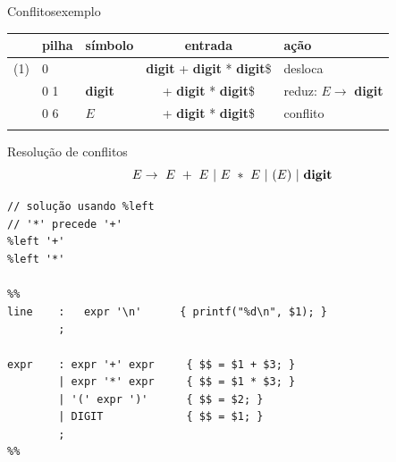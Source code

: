\begin{frame}{Conflitos}{exemplo}
\centering\small
  \bigskip

  \scriptsize
  \begin{tabular}[h]{r|l|l|c|l}
    \toprule
    & \hfil pilha &\hfil símbolo & entrada &\hfil ação \\
    \midrule
    (1) & 0 &  &\hfill {\bf digit} + {\bf digit} * {\bf digit}\$& desloca \\
    \only<2->{
    (2) & 0 1 &   {\bf digit} &\hfill + {\bf digit} * {\bf digit}\$ & reduz: $E\rightarrow$ {\bf digit} \\
    }
    \only<3->{
    (3) & 0 6 &   $E$ &\hfill + {\bf digit} * {\bf digit}\$ & {\large\color{red}conflito} \\
    }
    & & & &\\
   \bottomrule
  \end{tabular}
\end{frame}

\begin{frame}[fragile]{Resolução de conflitos}
  $$E \rightarrow\ E\ +\ E\ |\ E\ *\ E\ |\ (E)\ |\ \text{\bf digit} $$

  \small


\begin{lstlisting}
// solução usando %left
// '*' precede '+'
%left '+'
%left '*'

%%
line    :   expr '\n'      { printf("%d\n", $1); }
        ;

expr    : expr '+' expr     { $$ = $1 + $3; }
        | expr '*' expr     { $$ = $1 * $3; }
        | '(' expr ')'      { $$ = $2; }
        | DIGIT             { $$ = $1; }
        ;
%%
\end{lstlisting}
\end{frame}

